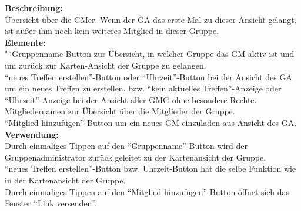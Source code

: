 \textbf{Beschreibung:}\\
Übersicht über die GMer. Wenn der GA das erste Mal zu dieser Ansicht gelangt, ist außer ihm noch kein weiteres Mitglied in dieser Gruppe.\\
\textbf{Elemente:}\\
"`Gruppenname\grqq-Button zur Übersicht, in welcher Gruppe das GM aktiv ist und um zurück zur Karten-Ansicht der Gruppe zu gelangen.\\
"`neues Treffen erstellen"'-Button oder "`Uhrzeit"'-Button bei der Ansicht des GA um ein neues Treffen zu erstellen, bzw. "`kein aktuelles Treffen"'-Anzeige oder "`Uhrzeit"'-Anzeige bei der Ansicht aller GMG ohne besondere Rechte.\\
Mitgliedernamen zur Übersicht über die Mitglieder der Gruppe.\\
"`Mitglied hinzufügen"'-Button um ein neues GM einzuladen aus Ansicht des GA.\\
\textbf{Verwendung:}\\
Durch einmaliges Tippen auf den "`Gruppenname"'-Button wird der Gruppenadministrator zurück geleitet zu der Kartenansicht der Gruppe.\\
"`neues Treffen erstellen"'-Button bzw. Uhrzeit-Button hat die selbe Funktion wie in der Kartenansicht der Gruppe.\\
Durch einmaliges Tippen auf den "`Mitglied hinzufügen"'-Button öffnet sich das Fenster "`Link versenden"'.
\clearpage
\newpage


